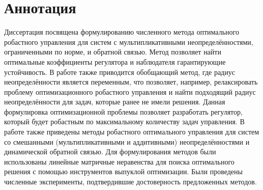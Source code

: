 \chapter*{Аннотация}                         %

Диссертация посвящена формулированию численного метода оптимального робастного управления для систем с мультипликативными неопределённостями, ограниченными по норме, и обратной связью. Метод позволяет найти оптимальные коэффициенты регулятора и наблюдателя гарантирующие устойчивость. В работе также приводится обобщающий метод, где радиус неопределённости является переменным, что позволяет, например, релаксировать проблему оптимизационного робастного управления и найти подходящий радиус неопределённости для задач, которые ранее не имели решения. Данная формулировка оптимизационной проблемы позволяет разработать регулятор, который будет робастным по максимальному количеству задач управления. В работе также приведены методы робастного оптимального управления для систем со смешанными (мультипликативными и аддитивными) неопределённостями и динамической обратной связью. Для формулирования методов были использованы линейные матричные неравенства для поиска оптимального решения с помощью инструментов выпуклой оптимизации. Были проведены численные эксперименты, подтвердившие достоверность предложенных методов.